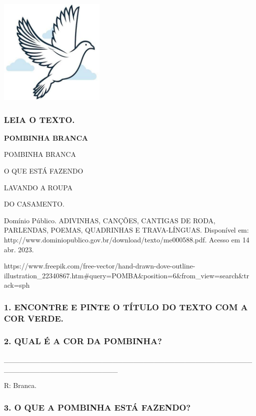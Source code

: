 \includegraphics[width=2.02153in,height=2.05208in]{media/image126.jpg}

\subsubsection{LEIA O TEXTO.}\label{leia-o-texto.}

\textbf{POMBINHA BRANCA}

POMBINHA BRANCA

O QUE ESTÁ FAZENDO

LAVANDO A ROUPA

DO CASAMENTO.

Domínio Público. ADIVINHAS, CANÇÕES, CANTIGAS DE RODA, PARLENDAS, POEMAS, QUADRINHAS E TRAVA-LÍNGUAS. Disponível em: http://www.dominiopublico.gov.br/download/texto/me000588.pdf. Acesso em 14 abr. 2023.

https://www.freepik.com/free-vector/hand-drawn-dove-outline-illustration\_22340867.htm\#query=POMBA\&position=6\&from\_view=search\&track=sph

\subsubsection{1. ENCONTRE E PINTE O TÍTULO DO TEXTO COM A COR
VERDE.}\label{encontre-e-pinte-o-tuxedtulo-do-texto-com-a-cor-verde.}

\subsubsection{2. QUAL É A COR DA
POMBINHA?}\label{qual-uxe9-a-cor-da-pombinha}

\_\_\_\_\_\_\_\_\_\_\_\_\_\_\_\_\_\_\_\_\_\_\_\_\_\_\_\_\_\_\_\_\_\_\_\_\_\_\_\_\_\_\_\_\_\_\_\_\_\_\_\_\_\_\_\_\_\_\_\_\_\_\_\_\_\_\_\_\_\_

R: Branca.

\subsubsection{3. O QUE A POMBINHA ESTÁ
FAZENDO?}\label{o-que-a-pombinha-estuxe1-fazendo}

